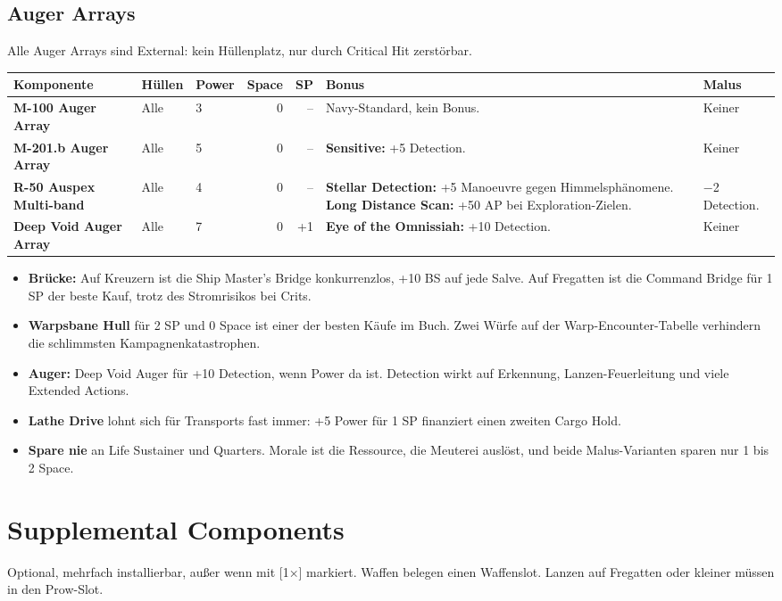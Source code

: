 \documentclass[9pt,a4paper]{extarticle}
\newcommand{\plus}[1]{\textcolor{good}{#1}}
\newcommand{\minus}[1]{\textcolor{bad}{#1}}
\newcommand{\nm}[1]{\textbf{#1}}
\newcommand{\eff}[1]{\textbf{#1:}}
\newcommand{\src}[1]{\hfill\raisebox{3pt}{\monofont\footnotesize\color{ink3}#1}}
\newcommand{\once}{{\monofont\scriptsize\color{ink3}[1×]}}
\newenvironment{urteil}{\begin{tcolorbox}[colback=brasssoft,colframe=brass,boxrule=0pt,leftrule=2pt,arc=0pt,left=6pt,right=6pt,top=4pt,bottom=4pt,before skip=6pt,after skip=10pt,title={\monofont\scriptsize\bfseries\color{brass}URTEIL},coltitle=brass,colbacktitle=brasssoft,toptitle=2pt,bottomtitle=0pt,attach title to upper=\par]\begin{itemize}[leftmargin=10pt,itemsep=1pt,parsep=0pt,topsep=2pt]}{\end{itemize}\end{tcolorbox}}
\begin{document}
\subsection{Auger Arrays}
Alle Auger Arrays sind External: kein Hüllenplatz, nur durch Critical Hit zerstörbar.
\begin{xltabular}{\linewidth}{l H P N N Y Y}
\toprule
{}\textbf{Komponente} & \textbf{Hüllen} & \textbf{Power} & \textbf{Space} & \textbf{SP} & \textbf{Bonus} & \textbf{Malus}\\
\midrule
\endhead
\nm{M-100 Auger Array} & Alle & 3 & 0 & – & Navy-Standard, kein Bonus. & Keiner\\
\nm{M-201.b Auger Array} & Alle & 5 & 0 & – & \eff{Sensitive} \plus{+5 Detection}. & Keiner\\
\nm{R-50 Auspex Multi-band} & Alle & 4 & 0 & – & \eff{Stellar Detection} \plus{+5 Manoeuvre} gegen Himmelsphänomene. \eff{Long Distance Scan} \plus{+50 AP} bei Exploration-Zielen. & \minus{−2 Detection}.\\
\nm{Deep Void Auger Array} & Alle & 7 & 0 & +1 & \eff{Eye of the Omnissiah} \plus{+10 Detection}. & Keiner\\
\bottomrule
\end{xltabular}

\begin{urteil}
\item \nm{Brücke:} Auf Kreuzern ist die Ship Master's Bridge konkurrenzlos, +10 BS auf jede Salve. Auf Fregatten ist die Command Bridge für 1 SP der beste Kauf, trotz des Stromrisikos bei Crits.
\item \nm{Warpsbane Hull} für 2 SP und 0 Space ist einer der besten Käufe im Buch. Zwei Würfe auf der Warp-Encounter-Tabelle verhindern die schlimmsten Kampagnenkatastrophen.
\item \nm{Auger:} Deep Void Auger für +10 Detection, wenn Power da ist. Detection wirkt auf Erkennung, Lanzen-Feuerleitung und viele Extended Actions.
\item \nm{Lathe Drive} lohnt sich für Transports fast immer: +5 Power für 1 SP finanziert einen zweiten Cargo Hold.
\item \nm{Spare nie} an Life Sustainer und Quarters. Morale ist die Ressource, die Meuterei auslöst, und beide Malus-Varianten sparen nur 1 bis 2 Space.
\end{urteil}

\section{Supplemental Components \src{S. 202--205, Tabellen 8-4 und 8-5}}
Optional, mehrfach installierbar, außer wenn mit \once{} markiert. Waffen belegen einen Waffenslot. Lanzen auf Fregatten oder kleiner müssen in den Prow-Slot.
\end{document}
